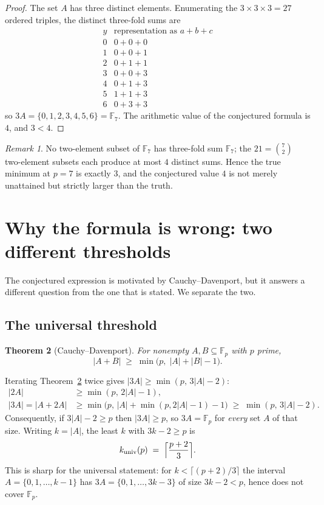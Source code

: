 \documentclass[11pt]{article}
\newtheorem{theorem}{Theorem}
\theoremstyle{definition}
\theoremstyle{remark}
\newtheorem{remark}[theorem]{Remark}
\begin{document}
\begin{proof}
The set $A$ has three distinct elements. Enumerating the $3 \times 3 \times 3 =
27$ ordered triples, the distinct three-fold sums are
\[
\begin{array}{c|c}
y & \text{representation as } a+b+c \\ \hline
0 & 0+0+0 \\
1 & 0+0+1 \\
2 & 0+1+1 \\
3 & 0+0+3 \\
4 & 0+1+3 \\
5 & 1+1+3 \\
6 & 0+3+3
\end{array}
\]
so $3A = \{0,1,2,3,4,5,6\} = \mathbb{F}_7$. The arithmetic value of the
conjectured formula is $4$, and $3 < 4$.
\end{proof}

\begin{remark}
No two-element subset of $\mathbb{F}_7$ has three-fold sum $\mathbb{F}_7$;
the $21 = \binom{7}{2}$ two-element subsets each produce at most $4$ distinct
sums. Hence the true minimum at $p=7$ is exactly $3$, and the conjectured
value $4$ is not merely unattained but strictly larger than the truth.
\end{remark}

\section{Why the formula is wrong: two different thresholds}

The conjectured expression is motivated by Cauchy--Davenport, but it answers a
different question from the one that is stated. We separate the two.

\subsection{The universal threshold}

\begin{theorem}[Cauchy--Davenport]\label{thm:cd}
For nonempty $A, B \subseteq \mathbb{F}_p$ with $p$ prime,
\[
  |A + B| \;\ge\; \min\bigl(p,\; |A| + |B| - 1\bigr).
\]
\end{theorem}

Iterating Theorem~\ref{thm:cd} twice gives $|3A| \ge \min(p,\, 3|A| - 2)$:
\begin{align*}
  |2A| &\ge \min(p,\, 2|A| - 1), \\
  |3A| = |A + 2A| &\ge \min\bigl(p,\, |A| + \min(p, 2|A|-1) - 1\bigr)
                    \;\ge\; \min(p,\, 3|A| - 2).
\end{align*}
Consequently, if $3|A| - 2 \ge p$ then $|3A| \ge p$, so $3A = \mathbb{F}_p$
for \emph{every} set $A$ of that size. Writing $k = |A|$, the least $k$ with
$3k - 2 \ge p$ is
\[
  k_{\mathrm{univ}}(p) \;=\; \Bigl\lceil \frac{p+2}{3} \Bigr\rceil .
\]
This is sharp for the universal statement: for $k < \lceil (p+2)/3 \rceil$ the
interval $A = \{0,1,\dots,k-1\}$ has $3A = \{0,1,\dots,3k-3\}$ of size
$3k - 2 < p$, hence does not cover $\mathbb{F}_p$.
\end{document}
